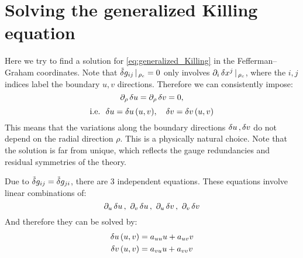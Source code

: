 \documentclass[12pt,a4paper,utf8]{article}
\newcommand{\tvar}[1]{\mathinner{\tilde{\delta} #1}}
\begin{document}
\section{Solving the generalized Killing equation}
\label{app:solve_Killing}
	Here we try to find a solution for \eqref{eq:generalized_Killing} in the Fefferman--Graham coordinates. 
%	
%	
	Note that $\tvar{g_{ij}}|_{\,\rho_c} = 0$ only involves $
		\partial_{i}\mathinner{\delta x^j}|_{\,\rho_c}
	$, where the $i,j$ indices label the boundary $u,v$ directions. 
	Therefore we can consistently impose:
	\begin{equation}
		\pdd{\rho}\var{u}%
		= \pdd{\rho}\var{v}%
		= 0,
	\end{equation}
	\begin{equation}
	\text{i.e.}\ \,
		\mathinner{\delta u} = \mathinner{\delta u}(u,v),
	\quad
		\mathinner{\delta v} = \mathinner{\delta v}(u,v)
	\end{equation}
	This means that the variations along the boundary directions $\mathinner{\delta u}, \mathinner{\delta v}$ do not depend on the radial direction $\rho$. This is a physically natural choice. Note that the solution is far from unique, which reflects the gauge redundancies and residual symmetries of the theory. 
	
	Due to $\tvar{g_{ij}} = \tvar{g_{ji}}$, there are 3 independent equations. These equations involve linear combinations of:
	\begin{equation}
		\pdd{u}\var{u}%
		,\ \pdd{v}\var{u}%
		,\ \pdd{u}\var{v}%
		,\ \pdd{v}\var{v}%
	\end{equation}
	And therefore they can be solved by:
	\begin{equation}
	\begin{aligned}
		\mathinner{\delta u}(u,v) &= a_{uu} u + a_{uv} v \\
		\mathinner{\delta v}(u,v) &= a_{vu} u + a_{vv} v
	\end{aligned}
	\end{equation}
	
\end{document}
